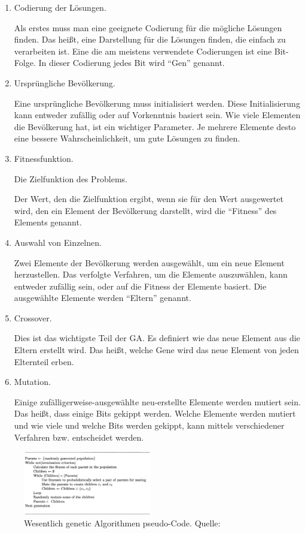 \documentclass[twoside,twocolumn]{article}
\begin{document}
\begin{enumerate}
\item{Codierung der Lösungen.}\par
Als erstes muss man eine geeignete Codierung für die mögliche Lösungen finden. Das heißt, eine Darstellung für die Lösungen finden, die einfach zu verarbeiten ist. Eine die am meistens verwendete Codierungen ist eine Bit-Folge. In dieser Codierung jedes Bit wird \enquote{Gen} genannt.
\item{Ursprüngliche Bevölkerung.}\par
Eine ursprüngliche Bevölkerung muss initialisiert werden. Diese Initialisierung kann entweder zufällig oder auf Vorkenntnis basiert sein. Wie viele Elementen die Bevölkerung hat, ist ein wichtiger Parameter. Je mehrere Elemente desto eine bessere Wahrscheinlichkeit, um gute Lösungen zu finden.
\item{Fitnessfunktion.}\par
Die Zielfunktion des Problems.\par
Der Wert, den die Zielfunktion ergibt, wenn sie für den Wert ausgewertet wird, den ein Element der Bevölkerung darstellt, wird die \enquote{Fitness} des Elements genannt.
\item{Auswahl von Einzelnen.}\par
Zwei Elemente der Bevölkerung werden ausgewählt, um ein neue Element herzustellen. Das verfolgte Verfahren, um die Elemente auszuwählen, kann entweder zufällig sein, oder auf die Fitness der Elemente basiert. Die ausgewählte Elemente werden \enquote{Eltern} genannt.
\item{Crossover.}\par
Dies ist das wichtigste Teil der GA. Es definiert wie das neue Element aus die Eltern erstellt wird. Das heißt, welche Gene wird das neue Element von jeden Elternteil erben.
\item{Mutation.}\par
Einige zufälligerweise-ausgewählte neu-erstellte Elemente werden mutiert sein. Das heißt, dass einige Bits gekippt werden. Welche Elemente werden mutiert und wie viele und welche Bits werden gekippt, kann mittels verschiedener Verfahren bzw. entscheidet werden.
\end{enumerate}

\begin{figure}[h]
\caption{Wesentlich genetic Algorithmen pseudo-Code. Quelle: \cite{wiley_evolutionary}}
\label{fig:ga_pseudo}
\centering
\includegraphics[width=0.5\textwidth]{images/ga_pseudo.png}
\end{figure}
\end{document}

